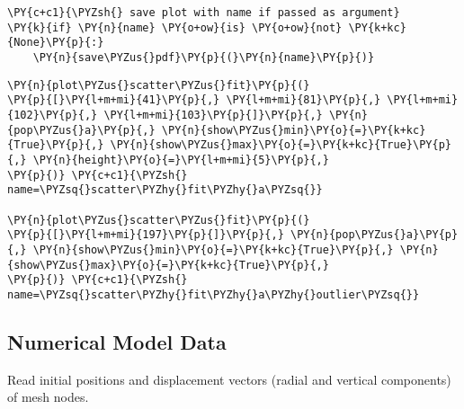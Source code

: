 \begin{tcolorbox}[breakable, size=fbox, boxrule=1pt, pad at break*=1mm,colback=cellbackground, colframe=cellborder]
\begin{Verbatim}[commandchars=\\\{\}]
\PY{c+c1}{\PYZsh{} save plot with name if passed as argument}
\PY{k}{if} \PY{n}{name} \PY{o+ow}{is} \PY{o+ow}{not} \PY{k+kc}{None}\PY{p}{:}
    \PY{n}{save\PYZus{}pdf}\PY{p}{(}\PY{n}{name}\PY{p}{)}
\end{Verbatim}
\end{tcolorbox}

\begin{tcolorbox}[breakable, size=fbox, boxrule=1pt, pad at break*=1mm,colback=cellbackground, colframe=cellborder]
\begin{Verbatim}[commandchars=\\\{\}]
\PY{n}{plot\PYZus{}scatter\PYZus{}fit}\PY{p}{(}
\PY{p}{[}\PY{l+m+mi}{41}\PY{p}{,} \PY{l+m+mi}{81}\PY{p}{,} \PY{l+m+mi}{102}\PY{p}{,} \PY{l+m+mi}{103}\PY{p}{]}\PY{p}{,} \PY{n}{pop\PYZus{}a}\PY{p}{,} \PY{n}{show\PYZus{}min}\PY{o}{=}\PY{k+kc}{True}\PY{p}{,} \PY{n}{show\PYZus{}max}\PY{o}{=}\PY{k+kc}{True}\PY{p}{,} \PY{n}{height}\PY{o}{=}\PY{l+m+mi}{5}\PY{p}{,}
\PY{p}{)} \PY{c+c1}{\PYZsh{} name=\PYZsq{}scatter\PYZhy{}fit\PYZhy{}a\PYZsq{}}

\PY{n}{plot\PYZus{}scatter\PYZus{}fit}\PY{p}{(}
\PY{p}{[}\PY{l+m+mi}{197}\PY{p}{]}\PY{p}{,} \PY{n}{pop\PYZus{}a}\PY{p}{,} \PY{n}{show\PYZus{}min}\PY{o}{=}\PY{k+kc}{True}\PY{p}{,} \PY{n}{show\PYZus{}max}\PY{o}{=}\PY{k+kc}{True}\PY{p}{,}
\PY{p}{)} \PY{c+c1}{\PYZsh{} name=\PYZsq{}scatter\PYZhy{}fit\PYZhy{}a\PYZhy{}outlier\PYZsq{}}
\end{Verbatim}
\end{tcolorbox}

\hypertarget{numerical-model-data}{%
\subsection{Numerical Model Data}\label{numerical-model-data}}

Read initial positions and displacement vectors (radial and vertical
components) of mesh nodes.

